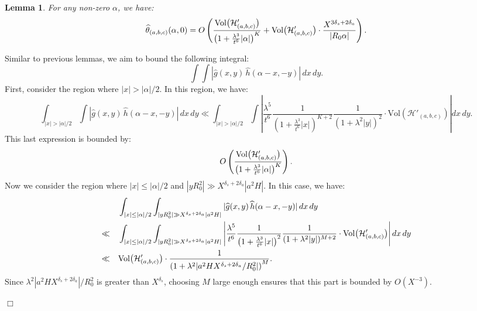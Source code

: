 \documentclass{article}
\def\Vol{{\rm Vol}}
\def\H{{\mathcal H}}
\def\H{{\mathcal H}}
\newtheorem{lemma}[theorem]{Lemma}
\newenvironment{proof}{\noindent {\bf Proof:}}{$\Box$ \vspace{2 ex}}
\begin{document}
\begin{lemma}\label{theta-fourir-beta=0} For any non-zero $\alpha$, we have: 
\begin{equation*} \widehat{\theta}_{(a, b, c)}(\alpha, 0) = O\left(\frac{\Vol\big(\H'_{(a,b,c)}\big)}{\left(1 + \frac{\lambda^3}{t^6} |\alpha|\right)^K} + \Vol\big(\H'_{(a,b,c)}\big) \cdot \frac{X^{3 \delta_s+2\delta_a}}{|R_0 \alpha|}\right). \end{equation*} 
\end{lemma}


\begin{proof}
 Similar to previous lemmas, we aim to bound the following integral: \begin{equation*} 
 \int \int |\widehat{g}(x, y) \, \widehat{h}(\alpha - x, -y)| \, dx \, dy. 
 \end{equation*} 
 First, consider the region where $|x| > |\alpha|/2$. In this region, we have: 
 \begin{equation*} 
 \int_{|x| > |\alpha|/2} \int |\widehat{g}(x, y) \, \widehat{h}(\alpha - x, -y)| \, dx \, dy \ll \int_{|x| > |\alpha|/2} \int \left| \frac{\lambda^5}{t^6} \frac{1}{\left(1 + \frac{\lambda^3}{t^6} |x|\right)^{K+2}} \frac{1}{(1 + \lambda^2 |y|)^2} \cdot \mathrm{Vol}(\H'_{(a,b,c)}) \right| dx \, dy. 
 \end{equation*}
This last expression is bounded by: \begin{equation*} O\left( \frac{\Vol\big(\H'_{(a,b,c)}\big)}{\big(1 + \frac{\lambda^3}{t^6} |\alpha|\big)^K} \right). \end{equation*}
Now we consider the region where $|x| \leq |\alpha|/2$ and $|y R_0^2| \gg X^{\delta_s + 2 \delta_a} |a^2 H|$. In this case, we have:
\begin{align*}
    &\int_{|x| \leq |\alpha|/2} \int_{|y R_0^2| \gg X^{\delta_s + 2 \delta_a} |a^2 H|} |\widehat{g}(x, y) \, \widehat{h}(\alpha - x, -y)| \, dx \, dy \\
    \ll \quad &\int_{|x| \leq |\alpha|/2} \int_{|y R_0^2| \gg X^{\delta_s + 2 \delta_a} |a^2 H|} \left| \frac{\lambda^5}{t^6} \frac{1}{\left(1 + \frac{\lambda^3}{t^6} |x|\right)^2} \frac{1}{(1 + \lambda^2 |y|)^{M+2}} \cdot \Vol\big(\H'_{(a,b,c)}\big) \right| dx \, dy \\
    \ll\quad&\Vol\big(\H'_{(a,b,c)}\big) \cdot \frac{1}{\left(1 + \lambda^2 |a^2 H X^{\delta_s + 2 \delta_a} / R_0^2|\right)^M}.
\end{align*}
Since $\lambda^2 |a^2 H X^{\delta_s + 2 \delta_a}| / R_0^2$ is greater than $X^{\delta_s}$, choosing $M$ large enough ensures that this part is bounded by $O(X^{-3})$.


\end{proof}
\end{document}
